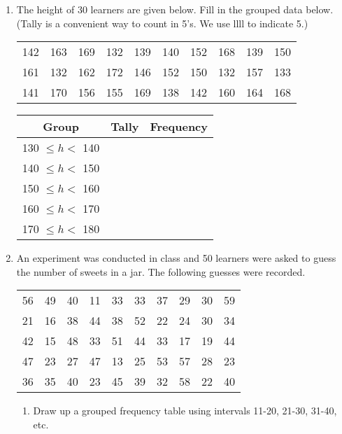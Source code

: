 \documentclass[10pt,a4paper,titlepage,twoside,openright]{report}
\begin{document}
\begin{enumerate}
\item{
The height of 30 learners are given below. Fill in the grouped data below. (Tally is a convenient way to count in 5's. We use llll to indicate 5.)

\begin{center}
\begin{tabular}{c c c c c c c c c c}
142 & 163 & 169 & 132 & 139 & 140 & 152 & 168 & 139 & 150 \\
161 & 132 & 162 & 172 & 146 & 152 & 150 & 132 & 157 & 133 \\
141 & 170 & 156 & 155 & 169 & 138 & 142 & 160 & 164 & 168 \\
\end{tabular}
\end{center}

\begin{center}
\begin{tabular}{|c|c|c|}\hline
Group & Tally & Frequency \\\hline
130 $\leq h <$ 140 & & \\\hline
140 $\leq h <$ 150 & & \\\hline
150 $\leq h <$ 160 & & \\\hline
160 $\leq h <$ 170 & & \\\hline
170 $\leq h <$ 180 & & \\\hline
\end{tabular}
\end{center}
}

\item{
An experiment was conducted in class and 50 learners were asked to guess the number of sweets in a jar. The following guesses were recorded.

\begin{center}
\begin{tabular}{c c c c c c c c c c}
56 & 49 & 40 & 11 & 33 & 33 & 37 & 29 & 30 & 59 \\
21 & 16 & 38 & 44 & 38 & 52 & 22 & 24 & 30 & 34 \\
42 & 15 & 48 & 33 & 51 & 44 & 33 & 17 & 19 & 44 \\
47 & 23 & 27 & 47 & 13 & 25 & 53 & 57 & 28 & 23 \\
36 & 35 & 40 & 23 & 45 & 39 & 32 & 58 & 22 & 40 \\
\end{tabular}
\end{center}

\begin{enumerate}
\item{Draw up a grouped frequency table using intervals 11-20, 21-30, 31-40, etc.}
\end{enumerate}
}
\end{enumerate}
\end{document}

